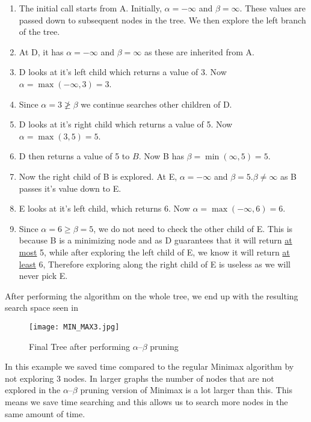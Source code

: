 \begin{enumerate}
    \item The initial call starts from A. Initially, $\alpha = -\infty$ and $\beta=\infty$. These values are passed down to subsequent nodes in the tree. We then explore the left branch of the tree.
    \item At D, it has $\alpha = -\infty$ and $\beta = \infty$ as these are inherited from A.
    \item D looks at it's left child which returns a value of 3. Now $\alpha = \max(-\infty, 3) = 3$.
    \item Since $\alpha = 3 \not\geq \beta$ we continue searches other children of D.
    \item D looks at it's right child which returns a value of 5. Now $\alpha = \max(3, 5) = 5$.
    \item D then returns a value of 5 to $B$. Now B has $\beta = \min(\infty, 5) = 5$.
    \item Now the right child of B is explored. At E, $\alpha = -\infty$ and $\beta = 5$.$\beta \neq \infty$ as B passes it's value down to E.
    \item E looks at it's left child, which returns 6. Now $\alpha = \max(-\infty, 6) = 6$.
    \item Since $\alpha = 6 \geq \beta = 5$, we do not need to check the other child of E. This is because B is a minimizing node and as D guarantees that it will return \underline{at most} 5, while after exploring the left child of E, we know it will return \underline{at least} 6, Therefore exploring along the right child of E is useless as we will never pick E.
\end{enumerate}

After performing the algorithm on the whole tree, we end up with the resulting search space seen in 

\begin{figure}
    \centering
    \texttt{[image: MIN\_MAX3.jpg]}
    \caption{Final Tree after performing $\alpha$--$\beta$ pruning}
    \label{im:finaltree}
\end{figure}

In this example we saved time compared to the regular Minimax algorithm by not exploring 3 nodes. In larger graphs the number of nodes that are not explored in the $\alpha$--$\beta$ pruning version of Minimax is a lot larger than this. This means we save time searching and this allows us to search more nodes in the same amount of time.



